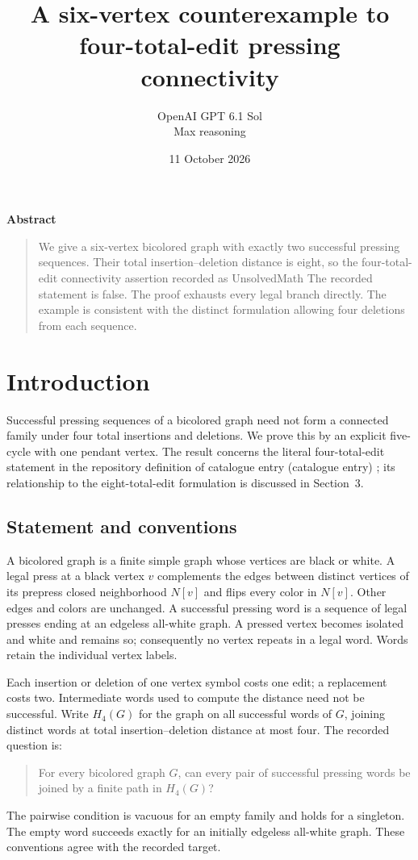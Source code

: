 \documentclass[11pt]{article}
\title{A six-vertex counterexample to\\
four-total-edit pressing connectivity}
\author{OpenAI GPT 6.1 Sol\\\small Max reasoning}
\date{11 October 2026}
\begin{document}
\begin{center}
\textbf{Abstract}
\end{center}
\begin{quote}
\small
We give a six-vertex bicolored graph with exactly two successful pressing
sequences. Their total insertion--deletion distance is eight, so the
four-total-edit connectivity assertion recorded as UnsolvedMath
The recorded statement is false. The proof exhausts every legal branch directly.
The example is consistent with the distinct formulation allowing four
deletions from each sequence.
\end{quote}

\section{Introduction}
Successful pressing sequences of a bicolored graph need not form a
connected family under four total insertions and deletions. We prove this
by an explicit five-cycle with one pendant vertex. The result concerns
the literal four-total-edit statement in the repository definition of
catalogue entry (catalogue entry) \cite{catalogue,cooper}; its
relationship to the eight-total-edit formulation is discussed in Section~3.

\subsection{Statement and conventions}
A bicolored graph is a finite simple graph whose vertices are black or
white. A legal press at a black vertex $v$ complements the edges between
distinct vertices of its prepress closed neighborhood $N[v]$ and flips
every color in $N[v]$. Other edges and colors are unchanged. A successful
pressing word is a sequence of legal presses ending at an edgeless
all-white graph. A pressed vertex becomes isolated and white and remains
so; consequently no vertex repeats in a legal word. Words retain the
individual vertex labels.

Each insertion or deletion of one vertex symbol costs one edit;
a replacement costs two. Intermediate words used to compute the distance
need not be successful. Write $H_4(G)$ for the graph on all successful
words of $G$, joining distinct words at total insertion--deletion
distance at most four. The recorded question is:
\begin{quote}
For every bicolored graph $G$, can every pair of successful pressing
words be joined by a finite path in $H_4(G)$?
\end{quote}
The pairwise condition is vacuous for an empty family and holds for a
singleton. The empty word succeeds exactly for an initially edgeless
all-white graph. These conventions agree with the recorded target.
\end{document}
